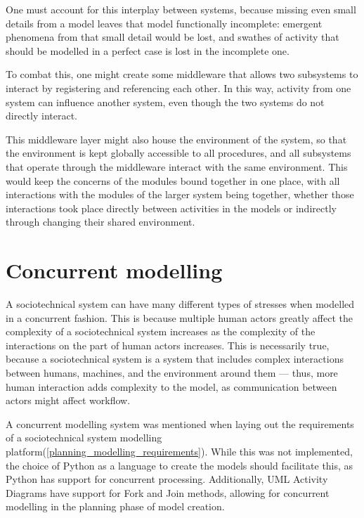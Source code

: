 One must account for this interplay between systems, because missing even small details from a model leaves that model functionally incomplete: emergent phenomena from that small detail would be lost, and swathes of activity that should be modelled in a perfect case is lost in the incomplete one. \par

To combat this, one might create some middleware that allows two subsystems to interact by registering and referencing each other. In this way, activity from one system can influence another system, even though the two systems do not directly interact. \par

This middleware layer might also house the environment of the system, so that the environment is kept globally accessible to all procedures, and all subsystems that operate through the middleware interact with the same environment. This would keep the concerns of the modules bound together in one place, with all interactions with the modules of the larger system being together, whether those interactions took place directly between activities in the models or indirectly through changing their shared environment. \par

\section{Concurrent modelling}
\label{concurrent_modelling}
A sociotechnical system can have many different types of stresses when modelled in a concurrent fashion. This is because multiple human actors greatly affect the complexity of a sociotechnical system increases as the complexity of the interactions on the part of human actors increases. This is necessarily true, because a sociotechnical system is a system that includes complex interactions between humans, machines, and the environment around them\cite{Baxter2011} --- thus, more human interaction adds complexity to the model, as communication between actors might affect workflow. \par%

A concurrent modelling system was mentioned when laying out the requirements of a sociotechnical system modelling platform(\cref{planning_modelling_requirements}). While this was not implemented, the choice of Python as a language to create the models should facilitate this, as Python has support for concurrent processing\cite{16.2.58:online}. Additionally, UML Activity Diagrams have support for Fork and Join methods\cite{Omg2010}, allowing for concurrent modelling in the planning phase of model creation. \par%

